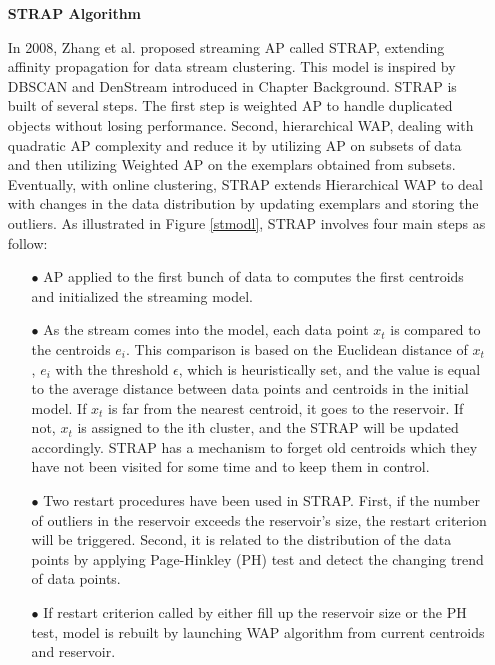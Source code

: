 \documentclass[../UNBThesis2.tex]{subfiles}
\begin{document}
\begin{itemize}[leftmargin=*]

\item[]\textbf{STRAP Algorithm}

In 2008, Zhang et al. \cite{zhang2008data} proposed streaming AP called STRAP, extending affinity propagation for data stream clustering. 
This model is inspired by DBSCAN and DenStream introduced in Chapter Background. STRAP is built of several steps. 
The first step is weighted AP to handle duplicated objects without losing performance.
Second, hierarchical WAP, dealing with quadratic AP complexity and reduce it by utilizing AP on subsets of data and then utilizing Weighted AP on the exemplars obtained from subsets.
Eventually, with online clustering, STRAP extends Hierarchical WAP to deal with changes in the data distribution by updating exemplars and storing the outliers. As illustrated in Figure \ref{stmodl}, STRAP involves four main steps as follow: 


\begin{itemize}
    \item[$\bullet$] AP applied to the first bunch of data to computes the first centroids and initialized the streaming model.
    \item[$\bullet$] As the stream comes into the model, each data point $x_t$ is compared to the centroids $e_i$. This comparison is based on the Euclidean distance of $x_t$, $e_i$ with the threshold $\epsilon$, which is heuristically set, and the value is equal to the average distance between data points and centroids in the initial model. If $x_t$ is far from the nearest centroid, it goes to the reservoir. If not, $x_t$ is assigned to the ith cluster, and the STRAP will be updated accordingly. STRAP has a mechanism to forget old centroids which they have not been visited for some time and to keep them in control.
    \item[$\bullet$]  Two restart procedures have been used in STRAP. First, if the number of outliers in the reservoir exceeds the reservoir's size, the restart criterion will be triggered. Second, it is related to the distribution of the data points by applying Page-Hinkley (PH) test and detect the changing trend of data points. 
    \item[$\bullet$] If restart criterion called by either fill up the reservoir size or the PH test, model is rebuilt by launching WAP algorithm from current centroids and reservoir.
\end{itemize}


\end{itemize}
\end{document}
